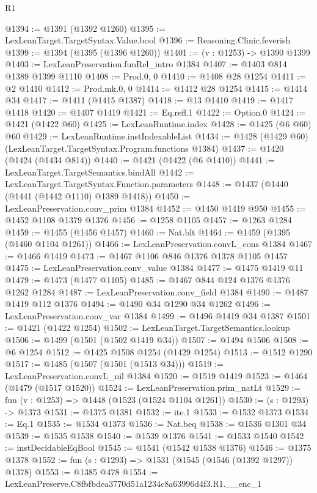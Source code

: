 \begin{lexlean}{R1}
\begin{coremodule}
@1394 := @1391 (@1392 @1260)
@1395 := LexLeanTarget.TargetSyntax.Value.bool
@1396 := Reasoning.Clinic.feverish
@1399 := @1394 (@1395 (@1396 @1260))
@1401 := (v : @1253) -> @1390 @1399
@1403 := LexLeanPreservation.funRel_intro @1384
@1407 := @1403 @814 @1389 @1399 @1110
@1408 := Prod.{0, 0}
@1410 := @1408 @28 @1254
@1411 := @2 @1410
@1412 := Prod.mk.{0, 0}
@1414 := @1412 @28 @1254
@1415 := @1414 @34
@1417 := @1411 (@1415 @1387)
@1418 := @13 @1410
@1419 := @1417 @1418
@1420 := @1407 @1419
@1421 := Eq.refl.{1}
@1422 := Option.{0}
@1424 := @1421 (@1422 @60)
@1425 := LexLeanRuntime.index
@1428 := @1425 (@6 @60) @60
@1429 := LexLeanRuntime.instIndexableList
@1434 := @1428 (@1429 @60) (LexLeanTarget.TargetSyntax.Program.functions @1384)
@1437 := @1420 (@1424 (@1434 @814))
@1440 := @1421 (@1422 (@6 @1410))
@1441 := LexLeanTarget.TargetSemantics.bindAll
@1442 := LexLeanTarget.TargetSyntax.Function.parameters
@1448 := @1437 (@1440 (@1441 (@1442 @1110) @1389 @1418))
@1450 := LexLeanPreservation.conv_prim @1384
@1452 := @1450 @1419 @950
@1455 := @1452 @1108 @1379 @1376
@1456 := @1258 @1105
@1457 := @1263 @1284
@1459 := @1455 (@1456 @1457)
@1460 := Nat.blt
@1464 := @1459 (@1395 (@1460 @1104 @1261))
@1466 := LexLeanPreservation.convL_cons @1384
@1467 := @1466 @1419
@1473 := @1467 @1106 @846 @1376 @1378 @1105 @1457
@1475 := LexLeanPreservation.conv_value @1384
@1477 := @1475 @1419 @11
@1479 := @1473 (@1477 @1105)
@1485 := @1467 @844 @124 @1376 @1376 @1262 @1284
@1487 := LexLeanPreservation.conv_field @1384
@1490 := @1487 @1419 @112 @1376
@1494 := @1490 @34 @1290 @34 @1262
@1496 := LexLeanPreservation.conv_var @1384
@1499 := @1496 @1419 @34 @1387
@1501 := @1421 (@1422 @1254)
@1502 := LexLeanTarget.TargetSemantics.lookup
@1506 := @1499 (@1501 (@1502 @1419 @34))
@1507 := @1494 @1506
@1508 := @6 @1254
@1512 := @1425 @1508 @1254 (@1429 @1254)
@1513 := @1512 @1290
@1517 := @1485 (@1507 (@1501 (@1513 @34)))
@1519 := LexLeanPreservation.convL_nil @1384
@1520 := @1519 @1419
@1523 := @1464 (@1479 (@1517 @1520))
@1524 := LexLeanPreservation.prim_natLt
@1529 := fun (v : @1253) => @1448 (@1523 (@1524 @1104 @1261))
@1530 := (s : @1293) -> @1373
@1531 := @1375 @1381
@1532 := ite.{1}
@1533 := @1532 @1373
@1534 := Eq.{1}
@1535 := @1534 @1373
@1536 := Nat.beq
@1538 := @1536 @1301 @34
@1539 := @1535 @1538
@1540 := @1539 @1376
@1541 := @1533 @1540
@1542 := instDecidableEqBool
@1545 := @1541 (@1542 @1538 @1376)
@1546 := @1375 @1378
@1552 := fun (s : @1293) => @1531 (@1545 (@1546 (@1392 @1297)) @1378)
@1553 := @1385 @478
@1554 := LexLeanPreserve.C8fbfbdea3770d51a1234c8a63996d4f3.R1.__enc_1

\end{coremodule}
\end{lexlean}
